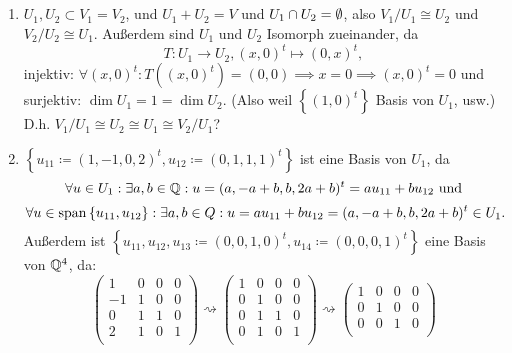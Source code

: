 \documentclass[sectionformat = aufgabe]{gadsescript}
\begin{document}
\maketitle
\setcounter{section}{3}
\subsection{}
\begin{enumerate}[label=(\alph*)]
	\item $ U_1, U_2 \subset V_1 = V_2 $, und $ U_1 + U_2 = V $ und $ U_1 \cap U_2 = \emptyset  $, also $ V_1 / U_1 \cong U_2 $ und $ V_2 / U_2 \cong U_1 $.
		Außerdem sind $ U_1 $ und $ U_2 $ Isomorph zueinander, da
		\[
			T: U_1 \to U_2, (x, 0)^t \mapsto (0, x)^t,
		\]
		injektiv: $ \forall (x, 0)^t : T((x, 0)^t) = (0, 0) \implies x = 0 \implies (x, 0)^t = 0 $ und surjektiv: $ \dim U_1 = 1 = \dim U_2 $. (Also weil $ \left\{ (1, 0)^t \right\}  $ Basis von $ U_1 $, usw.)\\
		D.h. $ V_1 / U_1 \cong U_2 \cong U_1 \cong V_2 / U_1 $?
	\item $ \left\{ u_{11} \coloneqq  (1, -1, 0, 2)^t, u_{12} \coloneqq (0, 1, 1, 1)^t \right\}  $ ist eine Basis von $ U_1 $, da
		\[
			\forall u \in U_1: \exists a, b \in \mathbb{Q} : u = (a, -a + b, b, 2a + b)^t = a u_{11} + b u_{12} \text{ und} 
		\]
		\[
			\forall u \in \operatorname{span} \left\{ u_{11}, u_{12} \right\} : \exists a, b \in Q : u = a u_{11} + b u_{12} = (a, -a + b, b, 2a + b)^t \in U_1.
		\]
		Außerdem ist $ \left\{ u_{11}, u_{12}, u_{13} \coloneqq (0, 0, 1, 0)^t, u_{14} \coloneqq  (0, 0, 0, 1)^t \right\}  $ eine Basis von $ \mathbb{Q} ^4 $, da:
		\[
			\begin{pmatrix}
				1 & 0 & 0 & 0\\
				-1 & 1 & 0 & 0\\
				0 & 1 & 1 & 0\\
				2 & 1 & 0 & 1\\
			\end{pmatrix} 
			\rightsquigarrow
			\begin{pmatrix}
				1 & 0 & 0 & 0\\
				0 & 1 & 0 & 0\\
				0 & 1 & 1 & 0\\
				0 & 1 & 0 & 1\\
			\end{pmatrix} 
			\rightsquigarrow
			\begin{pmatrix}
				1 & 0 & 0 & 0\\
				0 & 1 & 0 & 0\\
				0 & 0 & 1 & 0\\

\end{pmatrix}\]
\end{enumerate}
\end{document}
